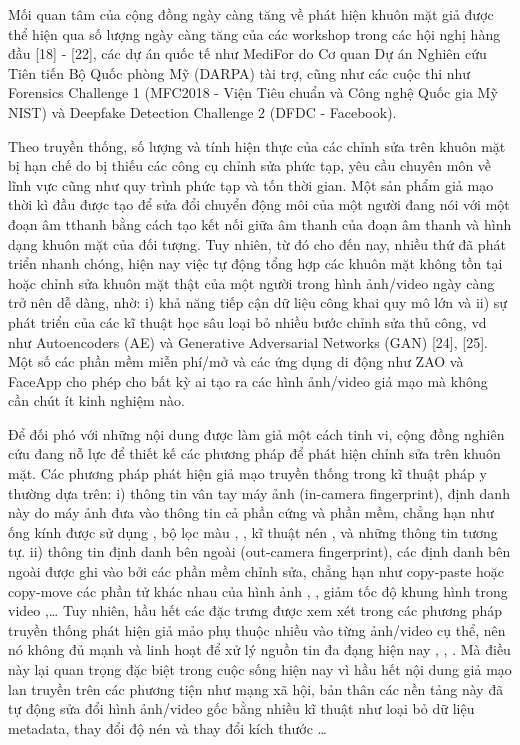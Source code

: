 \documentclass{article}
\begin{document}
Mối quan tâm của cộng đồng ngày càng tăng về phát hiện khuôn mặt giả được thể hiện qua số lượng ngày càng tăng của các workshop trong các hội nghị hàng đầu [18] - [22], các dự án quốc tế như MediFor do Cơ quan Dự án Nghiên cứu Tiên tiến Bộ Quốc phòng Mỹ (DARPA) tài trợ, cũng như các cuộc thi như Forensics Challenge 1 (MFC2018 - Viện Tiêu chuẩn và Công nghệ Quốc gia Mỹ NIST) và Deepfake Detection Challenge 2 (DFDC - Facebook).

Theo truyền thống, số lượng và tính hiện thực của các chỉnh sửa trên khuôn mặt bị hạn chế do bị thiếu các công cụ chỉnh sửa phức tạp, yêu cầu chuyên môn về lĩnh vực cũng như quy trình phức tạp và tốn thời gian. Một sản phẩm giả mạo thời kì đầu được tạo để sửa đổi chuyển động môi của một người đang nói với một đoạn âm tthanh bằng cách tạo kết nối giữa âm thanh của đoạn âm thanh và hình dạng khuôn mặt của đối tượng. Tuy nhiên, từ đó cho đến nay, nhiều thứ đã phát triển nhanh chóng, hiện nay việc tự động tổng hợp các khuôn mặt không tồn tại hoặc chỉnh sửa khuôn mặt thật của một người trong hình ảnh/video ngày càng trở nên dễ dàng, nhờ: i) khả năng tiếp cận dữ liệu công khai quy mô lớn và ii) sự phát triển của các kĩ thuật học sâu loại bỏ nhiều bước chỉnh sửa thủ công, vd như Autoencoders (AE) và Generative Adversarial Networks (GAN) [24], [25]. Một số các phần mềm miễn phí/mở và các ứng dụng di động như ZAO và FaceApp cho phép cho bất kỳ ai tạo ra các hình ảnh/video giả mạo mà không cần chút ít kinh nghiệm nào.

Để đối phó với những nội dung được làm giả một cách tinh vi, cộng đồng nghiên cứu đang nỗ lực để thiết kế các phương pháp để phát hiện chỉnh sửa trên khuôn mặt. Các phương pháp phát hiện giả mạo truyền thống trong kĩ thuật pháp y thường dựa trên: i) thông tin vân tay máy ảnh (in-camera fingerprint), định danh này do máy ảnh đưa vào thông tin cả phần cứng và phần mềm, chẳng hạn như ống kính được sử dụng , bộ lọc màu , , kĩ thuật nén ,  và những thông tin tương tự. ii) thông tin định danh bên ngoài (out-camera fingerprint), các định danh bên ngoài được ghi vào bởi các phần mềm chỉnh sửa, chẳng hạn như copy-paste hoặc copy-move các phần tử khác nhau của hình ảnh , , giảm tốc độ khung hình trong video   ,… Tuy nhiên, hầu hết các đặc trưng được xem xét trong các phương pháp truyền thống phát hiện giả mảo phụ thuộc nhiều vào từng ảnh/video cụ thể, nên nó không đủ mạnh và linh hoạt để xử lý nguồn tin đa đạng hiện nay , , . Mà điều này lại quan trọng đặc biệt trong cuộc sống hiện nay vì hầu hết nội dung giả mạo lan truyền trên các phương tiện như mạng xã hội, bản thân các nền tảng này đã tự động sửa đổi hình ảnh/video gốc bằng nhiều kĩ thuật như loại bỏ dữ liệu metadata, thay đổi độ nén và thay đổi kích thước …
\end{document}
